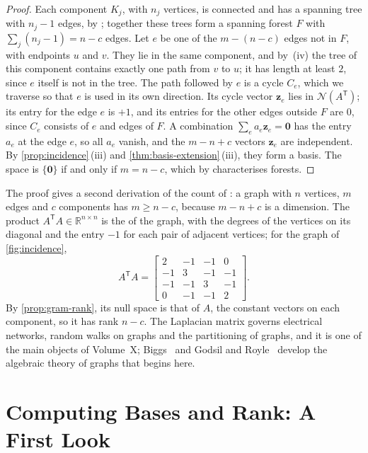 \begin{proof}
Each component $K_j$, with $n_j$ vertices, is connected and has a spanning tree with $n_j-1$ edges, by ; together these trees form a spanning forest $F$ with $\sum_j(n_j-1)=n-c$ edges. Let $e$ be one of the $m-(n-c)$ edges not in $F$, with endpoints $u$ and $v$. They lie in the same component, and by \,(iv) the tree of this component contains exactly one path from $v$ to $u$; it has length at least $2$, since $e$ itself is not in the tree. The path followed by $e$ is a cycle $C_e$, which we traverse so that $e$ is used in its own direction. Its cycle vector $\mathbf z_e$ lies in $\mathcal N(A^{\mathsf T})$; its entry for the edge $e$ is $+1$, and its entries for the other edges outside $F$ are $0$, since $C_e$ consists of $e$ and edges of $F$. A combination $\sum_ea_e\mathbf z_e=\mathbf 0$ has the entry $a_e$ at the edge $e$, so all $a_e$ vanish, and the $m-n+c$ vectors $\mathbf z_e$ are independent. By \cref{prop:incidence}\,(iii) and \cref{thm:basis-extension}\,(iii), they form a basis. The space is $\{\mathbf 0\}$ if and only if $m=n-c$, which by  characterises forests.
\end{proof}

The proof gives a second derivation of the count of : a graph with $n$ vertices, $m$ edges and $c$ components has $m\ge n-c$, because $m-n+c$ is a dimension. The product $A^{\mathsf T}A\in\mathbb R^{n\times n}$ is the  of the graph, with the degrees of the vertices on its diagonal and the entry $-1$ for each pair of adjacent vertices; for the graph of \cref{fig:incidence},
\[
A^{\mathsf T}A=\begin{bmatrix}2&-1&-1&0\\-1&3&-1&-1\\-1&-1&3&-1\\0&-1&-1&2\end{bmatrix}.
\]
By \cref{prop:gram-rank}, its null space is that of $A$, the constant vectors on each component, so it has rank $n-c$. The Laplacian matrix governs electrical networks, random walks on graphs and the partitioning of graphs, and it is one of the main objects of Volume~X; Biggs~\cite{biggs1993} and Godsil and Royle~\cite{godsil2001} develop the algebraic theory of graphs that begins here.

\section{Computing Bases and Rank: A First Look}
\label{sec:computing-rank}

